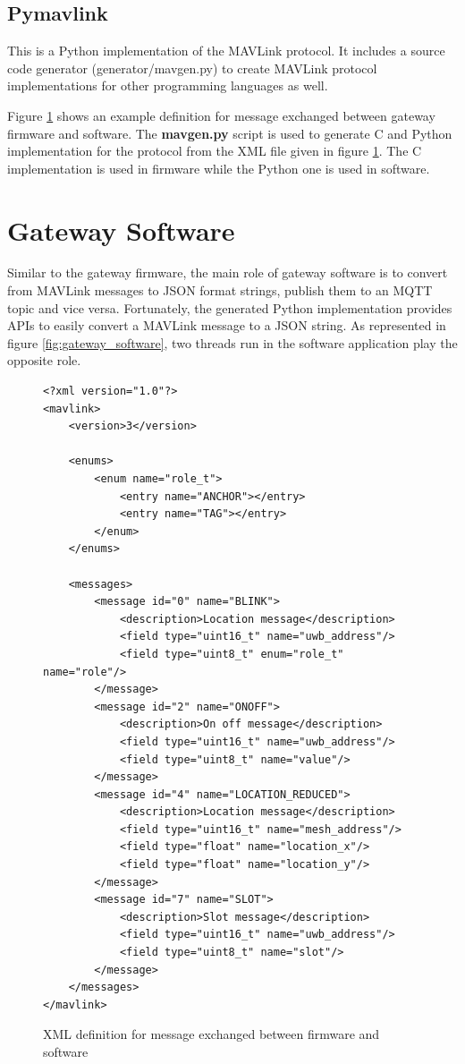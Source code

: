 \documentclass[\main/main.tex]{subfiles}
\begin{document}
\subsection{Pymavlink}

This is a Python implementation of the MAVLink protocol. It includes a source code generator (generator/mavgen.py) to create MAVLink protocol implementations for other programming languages as well. 

Figure \ref{net_mesh_mavlink_protocol} shows an example definition for message exchanged between gateway firmware and software. The \textbf{mavgen.py} script is used to generate C and Python implementation for the protocol from the XML file given in figure \ref{net_mesh_mavlink_protocol}. The C implementation is used in firmware while the Python one is used in software.

\section{Gateway Software}
Similar to the gateway firmware, the main role of gateway software is to convert from MAVLink messages to JSON format strings, publish them to an MQTT topic and vice versa. Fortunately, the generated Python implementation provides APIs to easily convert a MAVLink message to a JSON string. As represented in figure \ref{fig:gateway_software}, two threads run in the software application play the opposite role. 

\begin{figure}[H]
    \begin{lstlisting}[style=XMLStyle, emph={messages, message, enums, enum, mavlink}]
<?xml version="1.0"?>
<mavlink>
    <version>3</version>

    <enums>
        <enum name="role_t">
            <entry name="ANCHOR"></entry>
            <entry name="TAG"></entry>
        </enum>
    </enums>

    <messages>
        <message id="0" name="BLINK">
            <description>Location message</description>
            <field type="uint16_t" name="uwb_address"/>
            <field type="uint8_t" enum="role_t" name="role"/>
        </message>
        <message id="2" name="ONOFF">
            <description>On off message</description>
            <field type="uint16_t" name="uwb_address"/>
            <field type="uint8_t" name="value"/>
        </message>
        <message id="4" name="LOCATION_REDUCED">
            <description>Location message</description>
            <field type="uint16_t" name="mesh_address"/>
            <field type="float" name="location_x"/>
            <field type="float" name="location_y"/>
        </message>
        <message id="7" name="SLOT">
            <description>Slot message</description>
            <field type="uint16_t" name="uwb_address"/>
            <field type="uint8_t" name="slot"/>
        </message>
    </messages>
</mavlink>
    \end{lstlisting}
    \caption{XML definition for message exchanged between firmware and software}
    \label{net_mesh_mavlink_protocol}
\end{figure}
\end{document}
